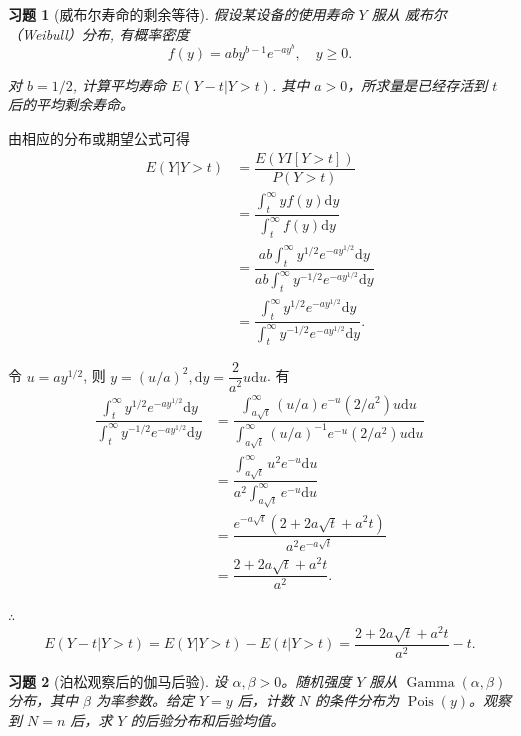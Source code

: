 \documentclass[UTF8,12pt,a4paper,fontset=fandol]{ctexart}
\newtheorem{exercise}{习题}[section]
\begin{document}
\begin{exercise}[威布尔寿命的剩余等待]\label{q:A6.14}
假设某设备的使用寿命 $Y$ 服从 威布尔（Weibull）分布, 有概率密度
    \[f(y)=aby^{b-1}e^{-ay^b},\quad y\geq0.\]

    对 $b=1/2$, 计算平均寿命 $E(Y-t|Y>t)$. 其中 $a>0$，所求量是已经存活到 $t$ 后的平均剩余寿命。\par{}
\end{exercise}

\begin{solve}\label{a:A6.14}
    由相应的分布或期望公式可得
    \begin{align*}
        E(Y|Y>t) & =\dfrac{E(YI[Y>t])}{P(Y>t)} \\
        & =\dfrac{\int_t^\infty yf(y)\mathrm{d}y}{\int_t^\infty f(y)\mathrm{d}y} \\
        & =\dfrac{ab\int_t^\infty y^{1/2}e^{-ay^{1/2}}\mathrm{d}y}{ab\int_t^\infty y^{-1/2}e^{-ay^{1/2}}\mathrm{d}y} \\
        & =\dfrac{\int_t^\infty y^{1/2}e^{-ay^{1/2}}\mathrm{d}y}{\int_t^\infty y^{-1/2}e^{-ay^{1/2}}\mathrm{d}y}.
    \end{align*}

    令 $u=ay^{1/2}$, 则 $y=(u/a)^2,\mathrm{d}y=\dfrac{2}{a^2}u\mathrm{d}u$. 有
    \begin{align*}
        \dfrac{\int_t^\infty y^{1/2}e^{-ay^{1/2}}\mathrm{d}y}{\int_t^\infty y^{-1/2}e^{-ay^{1/2}}\mathrm{d}y} & =\dfrac{\int_{a\sqrt{t}}^\infty(u/a)e^{-u}(2/a^2)u\mathrm{d}u}{\int_{a\sqrt{t}}^\infty(u/a)^{-1}e^{-u}(2/a^2)u\mathrm{d}u} \\
        & =\dfrac{\int_{a\sqrt{t}}^\infty u^2e^{-u}\mathrm{d}u}{a^2\int_{a\sqrt{t}}^\infty e^{-u}\mathrm{d}u} \\
        & =\dfrac{e^{-a\sqrt{t}}(2+2a\sqrt{t}+a^2t)}{a^2e^{-a\sqrt{t}}} \\
        & =\dfrac{2+2a\sqrt{t}+a^2t}{a^2}.
    \end{align*}

    $\therefore$
    \[E(Y-t|Y>t)=E(Y|Y>t)-E(t|Y>t)=\dfrac{2+2a\sqrt{t}+a^2t}{a^2}-t.\]
\end{solve}

\begin{exercise}[泊松观察后的伽马后验]\label{q:A6.15}
设 $\alpha,\beta>0$。随机强度 $Y$ 服从 $\operatorname{Gamma}(\alpha,\beta)$ 分布，其中 $\beta$ 为率参数。给定 $Y=y$ 后，计数 $N$ 的条件分布为 $\operatorname{Pois}(y)$。观察到 $N=n$ 后，求 $Y$ 的后验分布和后验均值。\par{}
\end{exercise}
\end{document}
